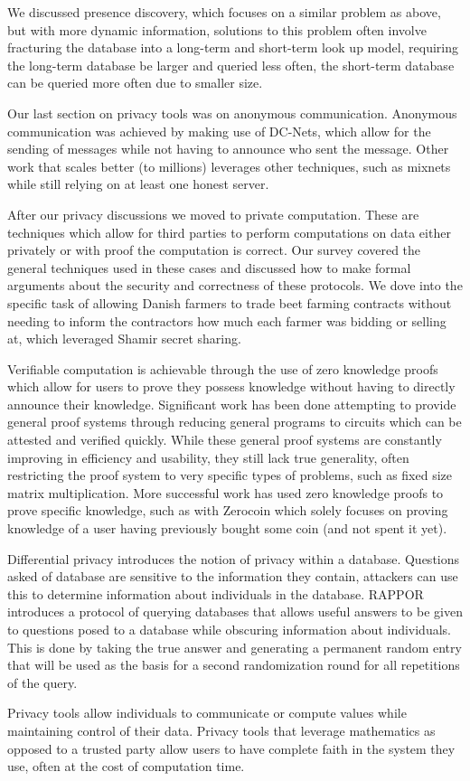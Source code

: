 We discussed presence discovery, which focuses on a similar problem as above,
but with more dynamic information, solutions to this problem often involve
fracturing the database into a long-term and short-term look up model, requiring
the long-term database be larger and queried less often, the short-term database
can be queried more often due to smaller size.

Our last section on privacy tools was on anonymous communication. Anonymous
communication was achieved by making use of DC-Nets, which allow for the sending
of messages while not having to announce who sent the message. Other work that
scales better (to millions) leverages other techniques, such as mixnets while
still relying on at least one honest server.

After our privacy discussions we moved to private computation. These are
techniques which allow for third parties to perform computations on data either
privately or with proof the computation is correct. Our survey covered the
general techniques used in these cases and discussed how to make formal
arguments about the security and correctness of these protocols. We dove into
the specific task of allowing Danish farmers to trade beet farming contracts
without needing to inform the contractors how much each farmer was bidding or
selling at, which leveraged Shamir secret sharing.

Verifiable computation is achievable through the use of zero knowledge proofs
which allow for users to prove they possess knowledge without having to directly
announce their knowledge. Significant work has been done attempting to provide
general proof systems through reducing general programs to circuits which can be
attested and verified quickly. While these general proof systems are constantly
improving in efficiency and usability, they still lack true generality, often
restricting the proof system to very specific types of problems, such as fixed
size matrix multiplication. More successful work has used zero knowledge proofs
to prove specific knowledge, such as with Zerocoin which solely focuses on
proving knowledge of a user having previously bought some coin (and not spent it
yet).

Differential privacy introduces the notion of privacy within a database.
Questions asked of database are sensitive to the information they contain,
attackers can use this to determine information about individuals in the
database. RAPPOR introduces a protocol of querying databases that allows useful
answers to be given to questions posed to a database while obscuring information
about individuals. This is done by taking the true answer and generating a
permanent random entry that will be used as the basis for a second randomization
round for all repetitions of the query.

Privacy tools allow individuals to communicate or compute values while
maintaining control of their data. Privacy tools that leverage mathematics as
opposed to a trusted party allow users to have complete faith in the system they
use, often at the cost of computation time.